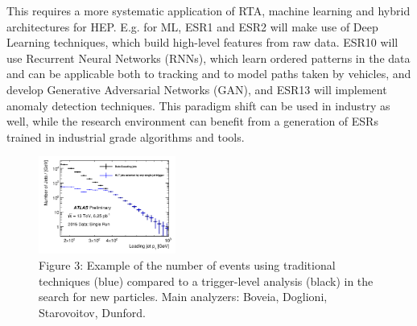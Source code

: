 This requires a more systematic application of RTA, machine learning and hybrid architectures for HEP. 
E.g. for ML, ESR1 and ESR2 will make use of Deep Learning techniques, which build high-level features from raw data.
ESR10 will use Recurrent Neural Networks (RNNs), which learn ordered patterns in the data and can be applicable both to tracking and to model paths taken by vehicles, and develop Generative Adversarial Networks (GAN), and ESR13 will implement anomaly detection techniques. 
This paradigm shift can be used in industry as well, while the research environment can benefit from a generation of ESRs trained in industrial grade algorithms and tools. 

\begin{figure}
	\vspace{-4mm}
\includegraphics[width=0.4\textwidth]{figs/TLA.png} 
    \vspace{-10mm} 
    \caption*{Figure 3: Example of the number of events using traditional techniques (blue) compared to a trigger-level analysis (black)
in the search for new particles. Main analyzers: Boveia, Doglioni, Starovoitov, Dunford. \label{fig:TLA}}
\vspace{-4mm}
    \end{figure}

